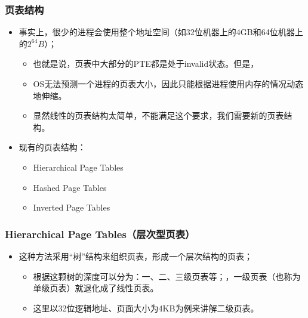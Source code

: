 \documentclass[CJKutf8,dvipsnames,table]{beamer}
\begin{document}
\begin{CJK*}{UTF8}{song}
  \begin{frame}
  \frametitle{页表结构} \pause
  \begin{itemize}
  \item{事实上，很少的进程会使用整个地址空间（如32位机器上的4GB和64位机器上的$2^{64}B$）；} \pause
    \begin{itemize}
    \item{也就是说，页表中大部分的PTE都是处于invalid状态。但是，} \pause
    \item{OS无法预测一个进程的页表大小，因此只能根据进程使用内存的情况动态地伸缩。} \pause
    \item{显然线性的页表结构太简单，不能满足这个要求，我们需要新的页表结构。} \pause
    \end{itemize}
  \item{现有的页表结构：} \pause
    \begin{itemize}
    \item{Hierarchical Page Tables} \pause
    \item{Hashed Page Tables} \pause
    \item{Inverted Page Tables}
    \end{itemize}
  \end{itemize}
  \end{frame}
  
  \begin{frame}
  \frametitle{Hierarchical Page Tables（层次型页表）} \pause
  \begin{itemize}
  \item{这种方法采用“树”结构来组织页表，形成一个层次结构的页表；} \pause
    \begin{itemize}
    \item{根据这颗树的深度可以分为：一、二、三级页表等；，一级页表（也称为单级页表）就退化成了线性页表。} \pause
    \item{这里以32位逻辑地址、页面大小为4KB为例来讲解二级页表。}
    \end{itemize}
  \end{itemize}
  \end{frame}
  

\end{CJK*}
\end{document}
